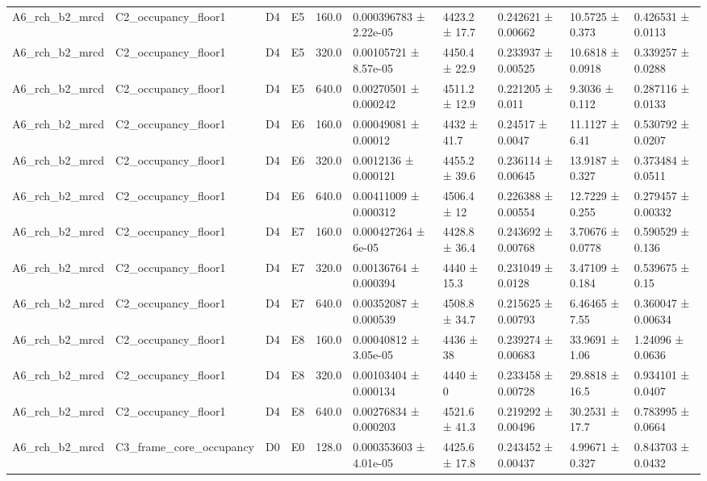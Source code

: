 \begin{table}
\begin{tabular}{llllllllll}
A6\_rch\_b2\_mrcd & C2\_occupancy\_floor1 & D4 & E5 & 160.0 & 0.000396783 ± 2.22e-05 & 4423.2 ± 17.7 & 0.242621 ± 0.00662 & 10.5725 ± 0.373 & 0.426531 ± 0.0113 \\
A6\_rch\_b2\_mrcd & C2\_occupancy\_floor1 & D4 & E5 & 320.0 & 0.00105721 ± 8.57e-05 & 4450.4 ± 22.9 & 0.233937 ± 0.00525 & 10.6818 ± 0.0918 & 0.339257 ± 0.0288 \\
A6\_rch\_b2\_mrcd & C2\_occupancy\_floor1 & D4 & E5 & 640.0 & 0.00270501 ± 0.000242 & 4511.2 ± 12.9 & 0.221205 ± 0.011 & 9.3036 ± 0.112 & 0.287116 ± 0.0133 \\
A6\_rch\_b2\_mrcd & C2\_occupancy\_floor1 & D4 & E6 & 160.0 & 0.00049081 ± 0.00012 & 4432 ± 41.7 & 0.24517 ± 0.0047 & 11.1127 ± 6.41 & 0.530792 ± 0.0207 \\
A6\_rch\_b2\_mrcd & C2\_occupancy\_floor1 & D4 & E6 & 320.0 & 0.0012136 ± 0.000121 & 4455.2 ± 39.6 & 0.236114 ± 0.00645 & 13.9187 ± 0.327 & 0.373484 ± 0.0511 \\
A6\_rch\_b2\_mrcd & C2\_occupancy\_floor1 & D4 & E6 & 640.0 & 0.00411009 ± 0.000312 & 4506.4 ± 12 & 0.226388 ± 0.00554 & 12.7229 ± 0.255 & 0.279457 ± 0.00332 \\
A6\_rch\_b2\_mrcd & C2\_occupancy\_floor1 & D4 & E7 & 160.0 & 0.000427264 ± 6e-05 & 4428.8 ± 36.4 & 0.243692 ± 0.00768 & 3.70676 ± 0.0778 & 0.590529 ± 0.136 \\
A6\_rch\_b2\_mrcd & C2\_occupancy\_floor1 & D4 & E7 & 320.0 & 0.00136764 ± 0.000394 & 4440 ± 15.3 & 0.231049 ± 0.0128 & 3.47109 ± 0.184 & 0.539675 ± 0.15 \\
A6\_rch\_b2\_mrcd & C2\_occupancy\_floor1 & D4 & E7 & 640.0 & 0.00352087 ± 0.000539 & 4508.8 ± 34.7 & 0.215625 ± 0.00793 & 6.46465 ± 7.55 & 0.360047 ± 0.00634 \\
A6\_rch\_b2\_mrcd & C2\_occupancy\_floor1 & D4 & E8 & 160.0 & 0.00040812 ± 3.05e-05 & 4436 ± 38 & 0.239274 ± 0.00683 & 33.9691 ± 1.06 & 1.24096 ± 0.0636 \\
A6\_rch\_b2\_mrcd & C2\_occupancy\_floor1 & D4 & E8 & 320.0 & 0.00103404 ± 0.000134 & 4440 ± 0 & 0.233458 ± 0.00728 & 29.8818 ± 16.5 & 0.934101 ± 0.0407 \\
A6\_rch\_b2\_mrcd & C2\_occupancy\_floor1 & D4 & E8 & 640.0 & 0.00276834 ± 0.000203 & 4521.6 ± 41.3 & 0.219292 ± 0.00496 & 30.2531 ± 17.7 & 0.783995 ± 0.0664 \\
A6\_rch\_b2\_mrcd & C3\_frame\_core\_occupancy & D0 & E0 & 128.0 & 0.000353603 ± 4.01e-05 & 4425.6 ± 17.8 & 0.243452 ± 0.00437 & 4.99671 ± 0.327 & 0.843703 ± 0.0432 \\

\end{tabular}
\end{table}
